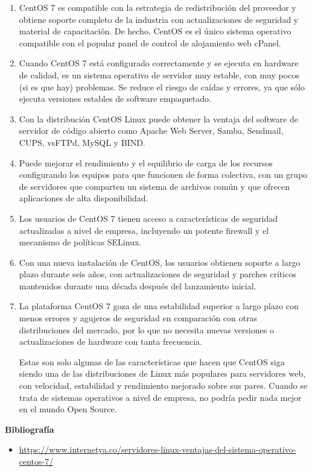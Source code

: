 \documentclass[11pt, a4paper]{report}
\begin{document}
\begin{enumerate}
\item CentOS 7 es compatible con la estrategia de redistribución del proveedor
  y obtiene soporte completo de la industria con actualizaciones de seguridad y
  material de capacitación. De hecho, CentOS es el único sistema operativo
  compatible con el popular panel de control de alojamiento web cPanel.

\item Cuando CentOS 7 está configurado correctamente y se ejecuta en hardware
  de calidad, es un sistema operativo de servidor muy estable, con muy pocos
  (si es que hay) problemas. Se reduce el riesgo de caídas y errores, ya que
  sólo ejecuta versiones estables de software empaquetado.

\item Con la distribución CentOS Linux puede obtener la ventaja del software de
  servidor de código abierto como Apache Web Server, Samba, Sendmail, CUPS,
  vsFTPd, MySQL y BIND.

\item Puede mejorar el rendimiento y el equilibrio de carga de los recursos
  configurando los equipos para que funcionen de forma colectiva, con un grupo
  de servidores que comparten un sistema de archivos común y que ofrecen
  aplicaciones de alta disponibilidad.

\item Los usuarios de CentOS 7 tienen acceso a características de seguridad
  actualizadas a nivel de empresa, incluyendo un potente firewall y el
  mecanismo de políticas SELinux.

\item Con una nueva instalación de CentOS, los usuarios obtienen soporte a
  largo plazo durante seis años, con actualizaciones de seguridad y parches
  críticos mantenidos durante una década después del lanzamiento inicial.

\item La plataforma CentOS 7 goza de una estabilidad superior a largo plazo con
  menos errores y agujeros de seguridad en comparación con otras distribuciones
  del mercado, por lo que no necesita nuevas versiones o actualizaciones de
  hardware con tanta frecuencia.

  Estas son solo algunas de las características que hacen que CentOS siga
  siendo una de las distribuciones de Linux más populares para servidores web,
  con velocidad, estabilidad y rendimiento mejorado sobre sus pares. Cuando se
  trata de sistemas operativos a nivel de empresa, no podría pedir nada mejor
  en el mundo Open Source.
\end{enumerate}

\newpage

\textbf{Bibliografía} \\

\begin{itemize}

\item \url{https://www.internetya.co/servidores-linux-ventajas-del-sistema-operativo-centos-7/}
\end{itemize}
\end{document}
